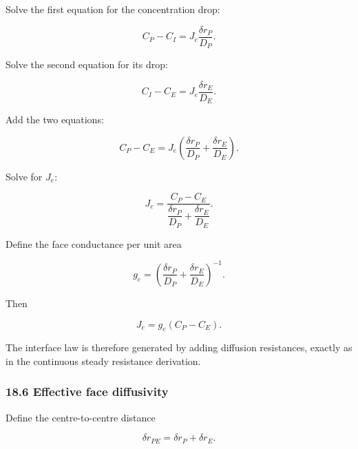 \documentclass[11pt,a4paper]{article}
\begin{document}
Solve the first equation for the concentration drop:

\begin{equation}
C_P-C_I
=
J_e\frac{\delta r_P}{D_P}.
\tag{TRISO-FV-135}
\label{eq:triso-fv-135}
\end{equation}

Solve the second equation for its drop:

\begin{equation}
C_I-C_E
=
J_e\frac{\delta r_E}{D_E}.
\tag{TRISO-FV-136}
\label{eq:triso-fv-136}
\end{equation}

Add the two equations:

\begin{equation}
C_P-C_E
=
J_e
\left(
\frac{\delta r_P}{D_P}
+
\frac{\delta r_E}{D_E}
\right).
\tag{TRISO-FV-137}
\label{eq:triso-fv-137}
\end{equation}

Solve for $J_e$:

\begin{equation}
\boxed{
J_e
=
\frac{
C_P-C_E
}{
\dfrac{\delta r_P}{D_P}
+
\dfrac{\delta r_E}{D_E}
}.
}
\tag{TRISO-FV-138}
\label{eq:triso-fv-138}
\end{equation}

Define the face conductance per unit area

\begin{equation}
\boxed{
g_e
=
\left(
\frac{\delta r_P}{D_P}
+
\frac{\delta r_E}{D_E}
\right)^{-1}.
}
\tag{TRISO-FV-139}
\label{eq:triso-fv-139}
\end{equation}

Then

\begin{equation}
\boxed{
J_e=g_e(C_P-C_E).
}
\tag{TRISO-FV-140}
\label{eq:triso-fv-140}
\end{equation}

The interface law is therefore generated by adding diffusion resistances, exactly as in the continuous steady resistance derivation.

\subsubsection*{18.6 Effective face diffusivity}

Define the centre-to-centre distance

\begin{equation}
\delta r_{PE}
=
\delta r_P+\delta r_E.
\tag{TRISO-FV-141}
\label{eq:triso-fv-141}
\end{equation}
\end{document}
